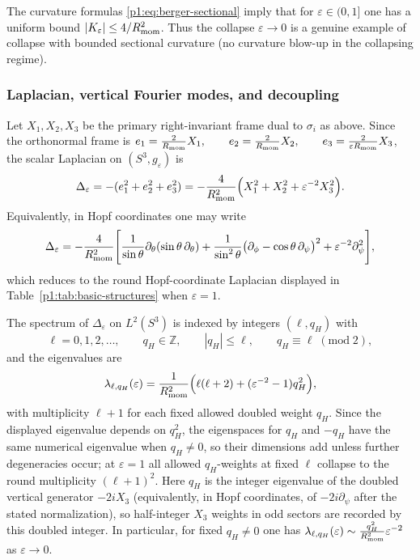 \documentclass[11pt]{article}
\begin{document}
\begin{remark}
The curvature formulas \eqref{p1:eq:berger-sectional} imply that for $\varepsilon\in(0,1]$ one has a uniform bound
$|K_\varepsilon|\le 4/R_{\mathrm{mom}}^2$. Thus the collapse $\varepsilon\to0$ is a genuine example of collapse with bounded sectional
curvature (no curvature blow-up in the collapsing regime).
\end{remark}


\subsubsection{Laplacian, vertical Fourier modes, and decoupling}
\label{p1:subsec:berger-spectrum-rigorous}

Let $X_1,X_2,X_3$ be the primary right-invariant frame dual to $\sigma_i$ as above. Since the orthonormal frame is
$e_1=\frac{2}{R_{\mathrm{mom}}}X_1,\qquad e_2=\frac{2}{R_{\mathrm{mom}}}X_2,\qquad e_3=\frac{2}{\varepsilon R_{\mathrm{mom}}}X_3$, the scalar Laplacian on
$(S^3,g_\varepsilon)$ is
\begin{equation}\label{p1:eq:berger-laplacian-leftinv}
\Delta_\varepsilon
=-(e_1^2+e_2^2+e_3^2)
=-\frac{4}{R_{\mathrm{mom}}^2}\Big(X_1^2+X_2^2+\varepsilon^{-2}X_3^2\Big).
\end{equation}
Equivalently, in Hopf coordinates one may write
\begin{equation}\label{p1:eq:berger-laplacian-hopf}
\Delta_\varepsilon=-\frac{4}{R_{\mathrm{mom}}^2}\Bigg[
\frac{1}{\sin\theta}\partial_\theta(\sin\theta\,\partial_\theta)
+\frac{1}{\sin^2\theta}\big(\partial_\phi-\cos\theta\,\partial_\psi\big)^2
+\varepsilon^{-2}\partial_\psi^2
\Bigg],
\end{equation}
which reduces to the round Hopf-coordinate Laplacian displayed in Table~\ref{p1:tab:basic-structures} when $\varepsilon=1$.

\begin{theorem}\label{p1:thm:berger-spectrum}
The spectrum of $\Delta_\varepsilon$ on $L^2(S^3)$ is indexed by integers $(\ell,q_H)$ with
\[
\ell=0,1,2,\dots,\qquad q_H\in\mathbb Z,\qquad |q_H|\le \ell,\qquad q_H\equiv \ell\;(\mathrm{mod}\;2),
\]
and the eigenvalues are
\begin{equation}
\label{p1:eq:berger-eigs-rigorous}
\lambda_{\ell,q_H}(\varepsilon)
=\frac{1}{R_{\mathrm{mom}}^2}\Big(\ell(\ell+2)+(\varepsilon^{-2}-1)q_H^2\Big),
\end{equation}
with multiplicity \(\ell+1\) for each fixed allowed doubled weight \(q_H\). Since the displayed eigenvalue depends on \(q_H^2\), the eigenspaces for \(q_H\) and \(-q_H\) have the same numerical eigenvalue when \(q_H\neq0\), so their dimensions add unless further degeneracies occur; at \(\varepsilon=1\) all allowed \(q_H\)-weights at fixed \(\ell\) collapse to the round multiplicity \((\ell+1)^2\). Here $q_H$ is the integer eigenvalue of the doubled vertical generator $-2iX_3$ (equivalently, in Hopf coordinates, of $-2i\partial_\psi$ after the stated normalization), so half-integer $X_3$ weights in odd sectors are recorded by this doubled integer.
In particular, for fixed $q_H\neq 0$ one has $\lambda_{\ell,q_H}(\varepsilon)\sim \frac{q_H^2}{R_{\mathrm{mom}}^2}\varepsilon^{-2}$
as $\varepsilon\to0$.
\end{theorem}
\end{document}
